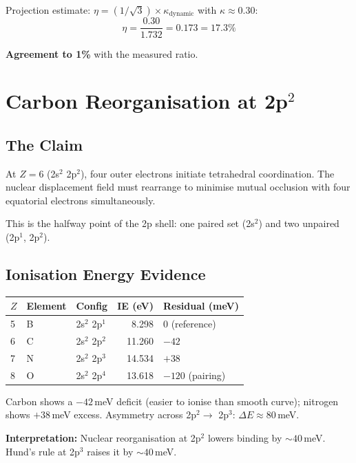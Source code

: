 Projection estimate: $\eta = (1/\sqrt{3}) \times \kappa_{\text{dynamic}}$ with $\kappa \approx 0.30$:
\begin{equation}
  \eta = \frac{0.30}{1.732} = 0.173 = 17.3\%
\end{equation}

\textbf{Agreement to 1\%} with the measured ratio.


\section{Carbon Reorganisation at 2p$^2$}

\subsection{The Claim}

At $Z = 6$ (2s$^2$ 2p$^2$), four outer electrons initiate tetrahedral coordination.  The nuclear displacement field must rearrange to minimise mutual occlusion with four equatorial electrons simultaneously.

This is the halfway point of the 2p shell: one paired set (2s$^2$) and two unpaired (2p$^1$, 2p$^2$).

\subsection{Ionisation Energy Evidence}

\begin{center}
\begin{tabular}{lllrl}
\hline
$Z$ & Element & Config & IE (eV) & Residual (meV) \\
\hline
5 & B & 2s$^2$ 2p$^1$ & 8.298 & 0 (reference) \\
6 & C & 2s$^2$ 2p$^2$ & 11.260 & $-42$ \\
7 & N & 2s$^2$ 2p$^3$ & 14.534 & $+38$ \\
8 & O & 2s$^2$ 2p$^4$ & 13.618 & $-120$ (pairing) \\
\hline
\end{tabular}
\end{center}

Carbon shows a $-42$\,meV deficit (easier to ionise than smooth curve); nitrogen shows $+38$\,meV excess.  Asymmetry across 2p$^2 \to$ 2p$^3$: $\Delta E \approx 80$\,meV.

\textbf{Interpretation:} Nuclear reorganisation at 2p$^2$ lowers binding by ${\sim}40$\,meV.  Hund's rule at 2p$^3$ raises it by ${\sim}40$\,meV.


